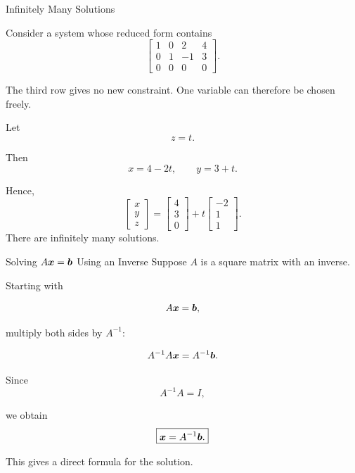 \begin{frame}{Infinitely Many Solutions}

Consider a system whose reduced form contains
\vspace{-0.1cm}
\[
\left[
\begin{array}{ccc|c}
1&0&2&4\\
0&1&-1&3\\
0&0&0&0
\end{array}
\right].
\]

The third row gives no new constraint. One variable can therefore be chosen freely.

Let
\vspace{-0.2cm}
\[
z=t.
\]

Then
\vspace{-0.1cm}
\[
x=4-2t,
\qquad
y=3+t.
\]

Hence,
\vspace{-0.1cm}
\[
\boxed{
\begin{bmatrix}
x\\y\\z
\end{bmatrix}
=
\begin{bmatrix}
4\\3\\0
\end{bmatrix}
+
t
\begin{bmatrix}
-2\\1\\1
\end{bmatrix}.
}
\]
\vspace{-0.1cm}
There are infinitely many solutions.

\end{frame}



\begin{frame}{Solving $A\bm{x}=\bm{b}$ Using an Inverse}
\vspace{-0.1cm}
Suppose $A$ is a square matrix with an inverse.

Starting with

\[
A\bm{x}=\bm{b},
\]

multiply both sides by $A^{-1}$:

\[
A^{-1}A\bm{x}
=
A^{-1}\bm{b}.
\]

Since
\vspace{-0.1cm}
\[
A^{-1}A=I,
\]

we obtain
\vspace{-0.1cm}
\[
\boxed{
\bm{x}=A^{-1}\bm{b}.
}
\]

This gives a direct formula for the solution.

\end{frame}


